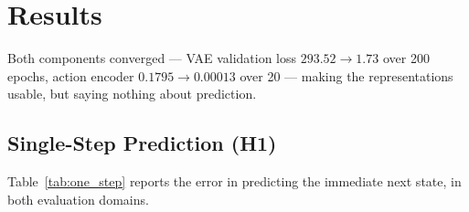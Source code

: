 \documentclass[conference]{IEEEtran}
\begin{document}
\section{Results}
\label{sec:results}

Both components converged --- VAE validation loss $293.52 \rightarrow 1.73$ over 200 epochs, action encoder $0.1795 \rightarrow 0.00013$ over 20 --- making the representations usable, but saying nothing about prediction.

\subsection{Single-Step Prediction (H1)}

Table~\ref{tab:one_step} reports the error in predicting the immediate next state, in both evaluation domains.
\end{document}
